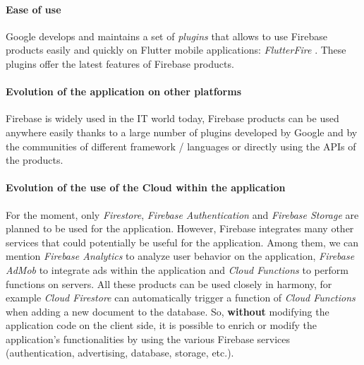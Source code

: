 \paragraph{Ease of use}
Google develops and maintains a set of \textit{plugins} that allows to use Firebase products easily and quickly on Flutter mobile applications:  \textit{FlutterFire} \cite{flutterfire}. These plugins offer the latest features of Firebase products.

\paragraph{Evolution of the application on other platforms}
Firebase is widely used in the IT world today, Firebase products can be used anywhere easily thanks to a large number of plugins developed by Google and by the communities of different framework / languages or directly using the APIs of the products.

\paragraph{Evolution of the use of the Cloud within the application}
For the moment, only \textit{Firestore}, \textit{Firebase Authentication} and \textit{Firebase Storage} are planned to be used for the application. However, Firebase integrates many other services that could potentially be useful for the application. Among them, we can mention \textit{Firebase Analytics} to analyze user behavior on the application, \textit{Firebase AdMob} to integrate ads within the application and \textit{Cloud Functions} to perform functions on servers. All these products can be used closely in harmony, for example \textit{Cloud Firestore} can automatically trigger a function of \textit{Cloud Functions} when adding a new document to the database. So, \textbf{without} modifying the application code on the client side, it is possible to enrich or modify the application's functionalities by using the various Firebase services (authentication, advertising, database, storage, etc.).
